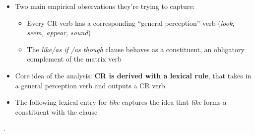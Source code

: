 \documentclass[11pt]{article}
\begin{document}
 \begin{itemize}
\item Two main empirical observations they're trying to capture: \begin{itemize}
    \item Every CR verb has a corresponding ``general perception'' verb (\textit{look, seem, appear, sound})
    \item The \textit{like\slash as if \slash as though} clause behaves as a constituent, an obligatory complement of the matrix verb
    \end{itemize}



\item Core idea of the analysis: \textbf{CR is derived with a lexical rule}, that takes in a general perception verb and outputs a CR verb.

\item The following lexical entry for \emph{like} captures the idea that \emph{like} forms a constituent with the clause
\end{itemize}
\ex. 
\end{document}
